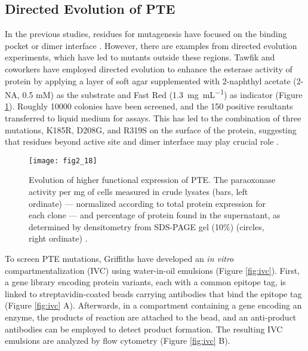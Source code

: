 \begin{refsection}
\subsection{Directed Evolution of PTE}

In the previous studies, residues for mutagenesis have focused on the binding
pocket or dimer interface \cite{Chen-Goodspeed2001a,Rochu2002b,Grimsley1997b}.
However, there are examples from directed evolution experiments, which have led
to mutants outside these regions. Tawfik and coworkers have employed directed
evolution to enhance the esterase activity of protein by applying a
layer of soft agar supplemented with 2-naphthyl acetate (2-NA, 0.5 mM) as the
substrate and Fast Red (\SI{1.3}{\mg\per\mL}) as indicator (Figure
\ref{fig:s5}). Roughly 10000 colonies have been screened, and the 150 positive
resultants transferred to liquid medium for assays.  This has led to
the combination of three mutations, K185R, D208G, and R319S on the surface of
the protein, suggesting that residues beyond active site and dimer interface
may play crucial role \cite{Roodveldt2005}.
\begin{figure}[htbp] \centering \texttt{[image: fig2\_18]}
    \caption[Evolution of higher functional expression of PTE. The paraoxonase
    activity per mg of cells measured in crude lysates (bars, left ordinate)
--- normalized according to total protein expression for each clone --- and
percentage of protein found in the supernatant, as determined by densitometry
from SDS-PAGE gel (10\%)  (circles, right ordinate).]{Evolution of higher
    functional expression of PTE. The paraoxonase activity per mg of cells
    measured in crude lysates (bars, left ordinate) --- normalized according to
    total protein expression for each clone --- and percentage of protein found
    in the supernatant, as determined by densitometry from SDS-PAGE gel (10\%)
    (circles, right ordinate) \cite{Roodveldt2005}.}
    \label{fig:s5}
\end{figure}

To screen PTE mutations, Griffiths  have developed an \emph{in
vitro} compartmentalization (IVC) using water-in-oil emulsions
\cite{Griffiths2003c} (Figure \ref{fig:ivc}). First, a gene library encoding
protein variants, each with a common epitope tag, is linked to
streptavidin-coated beads carrying antibodies that bind the epitope tag
\cite{Griffiths2003c} (Figure \ref{fig:ivc} A). Afterwards, in a compartment
containing a gene encoding an enzyme, the products of reaction are attached to
the bead, and an anti-product antibodies can be employed to detect product
formation. The resulting IVC emulsions are analyzed by flow cytometry (Figure
\ref{fig:ivc} B). 


\end{refsection}
